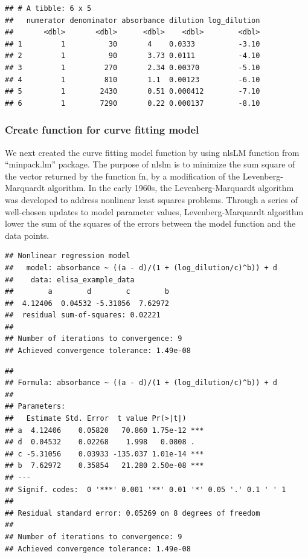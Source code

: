 \documentclass[
]{book}
\begin{document}
\begin{verbatim}
## # A tibble: 6 x 5
##   numerator denominator absorbance dilution log_dilution
##       <dbl>       <dbl>      <dbl>    <dbl>        <dbl>
## 1         1          30       4    0.0333          -3.10
## 2         1          90       3.73 0.0111          -4.10
## 3         1         270       2.34 0.00370         -5.10
## 4         1         810       1.1  0.00123         -6.10
## 5         1        2430       0.51 0.000412        -7.10
## 6         1        7290       0.22 0.000137        -8.10
\end{verbatim}

\subsubsection{Create function for curve fitting model}\label{create-function-for-curve-fitting-model}

We next created the curve fitting model function by using nlsLM function from ``minpack.lm'' package.
The purpose of nlslm is to minimize the sum square of the vector returned by the function fn, by a modification of the Levenberg-Marquardt algorithm. In the early 1960s, the Levenberg-Marquardt algorithm was developed to address nonlinear least squares problems. Through a series of well-chosen updates to model parameter values, Levenberg-Marquardt algorithm lower the sum of the squares of the errors between the model function and the data points.

\begin{verbatim}
## Nonlinear regression model
##   model: absorbance ~ ((a - d)/(1 + (log_dilution/c)^b)) + d
##    data: elisa_example_data
##        a        d        c        b 
##  4.12406  0.04532 -5.31056  7.62972 
##  residual sum-of-squares: 0.02221
## 
## Number of iterations to convergence: 9 
## Achieved convergence tolerance: 1.49e-08
\end{verbatim}

\begin{verbatim}
## 
## Formula: absorbance ~ ((a - d)/(1 + (log_dilution/c)^b)) + d
## 
## Parameters:
##   Estimate Std. Error  t value Pr(>|t|)    
## a  4.12406    0.05820   70.860 1.75e-12 ***
## d  0.04532    0.02268    1.998   0.0808 .  
## c -5.31056    0.03933 -135.037 1.01e-14 ***
## b  7.62972    0.35854   21.280 2.50e-08 ***
## ---
## Signif. codes:  0 '***' 0.001 '**' 0.01 '*' 0.05 '.' 0.1 ' ' 1
## 
## Residual standard error: 0.05269 on 8 degrees of freedom
## 
## Number of iterations to convergence: 9 
## Achieved convergence tolerance: 1.49e-08
\end{verbatim}
\end{document}
